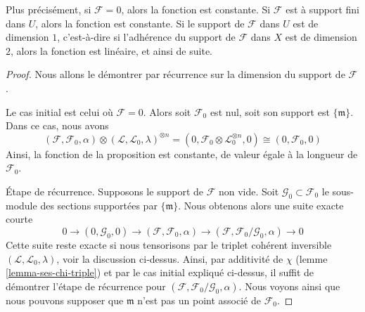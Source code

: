 \noindent
Plus précisément, si $\mathcal{F} = 0$, alors la fonction est constante.
Si $\mathcal{F}$ est à support fini dans $U$, alors la fonction est constante.
Si le support de $\mathcal{F}$ dans $U$ est de dimension $1$, c'est-à-dire
si l'adhérence du support de $\mathcal{F}$ dans $X$ est de dimension $2$, alors
la fonction est linéaire, et ainsi de suite.

\begin{proof}
Nous allons le démontrer par récurrence sur la dimension du support de
$\mathcal{F}$.

\medskip\noindent
Le cas initial est celui où $\mathcal{F} = 0$. Alors soit
$\mathcal{F}_0$ est nul, soit son support est $\{\mathfrak m\}$.
Dans ce cas, nous avons
$$
(\mathcal{F}, \mathcal{F}_0, \alpha) \otimes
(\mathcal{L}, \mathcal{L}_0, \lambda)^{\otimes n} =
(0, \mathcal{F}_0 \otimes \mathcal{L}_0^{\otimes n}, 0) \cong
(0, \mathcal{F}_0, 0)
$$
Ainsi, la fonction de la proposition est constante, de valeur égale
à la longueur de $\mathcal{F}_0$.

\medskip\noindent
Étape de récurrence. Supposons le support de $\mathcal{F}$ non vide.
Soit $\mathcal{G}_0 \subset \mathcal{F}_0$ le sous-module
des sections supportées par $\{\mathfrak m\}$. Nous obtenons alors une suite
exacte courte
$$
0 \to (0, \mathcal{G}_0, 0) \to
(\mathcal{F}, \mathcal{F}_0, \alpha) \to
(\mathcal{F}, \mathcal{F}_0/\mathcal{G}_0, \alpha) \to 0
$$
Cette suite reste exacte si nous tensorisons par le triplet cohérent
inversible $(\mathcal{L}, \mathcal{L}_0, \lambda)$, voir la
discussion ci-dessus. Ainsi, par additivité de $\chi$
(lemme \ref{lemma-ses-chi-triple})
et par le cas initial expliqué ci-dessus, il suffit de démontrer
l'étape de récurrence pour
$(\mathcal{F}, \mathcal{F}_0/\mathcal{G}_0, \alpha)$.
Nous voyons ainsi que nous pouvons supposer que $\mathfrak m$ n'est pas
un point associé de $\mathcal{F}_0$.


\end{proof}
